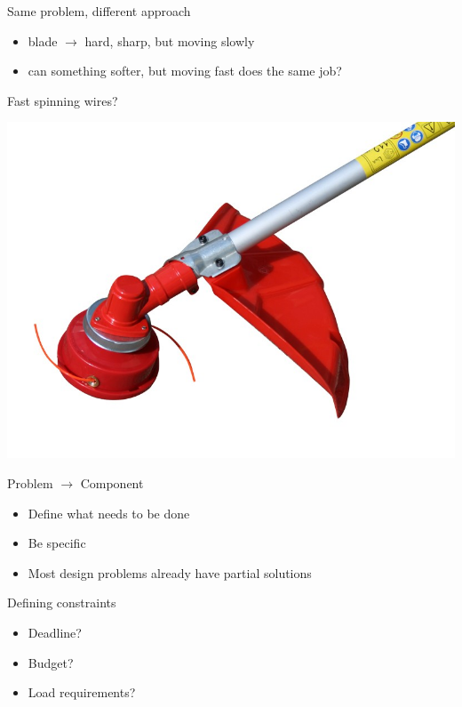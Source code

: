 \documentclass[10pt, svgnames]{beamer}
\begin{document}
\begin{frame}[label={sec:org883cc3a}]{Same problem, different approach}
\begin{itemize}
\item blade \(\rightarrow\) hard, sharp, but moving slowly
\item can something softer, but moving fast does the same job?
\end{itemize}
\end{frame}


\begin{frame}[label={sec:org0132e99}]{Fast spinning wires?}
\begin{center}
  \includegraphics[width=.8\linewidth]{./pictures/cutter-wire.jpg}
\end{center}
\end{frame}

\begin{frame}[label={sec:org2f8750e}]{Problem \(\rightarrow\) Component}
\begin{itemize}
\item Define what needs to be done
\item Be specific
\item Most design problems already have partial solutions
\end{itemize}
\end{frame}


\begin{frame}[label={sec:orgd744ef4}]{Defining constraints}
\begin{itemize}
\item Deadline?
\item Budget?
\item Load requirements?
\end{itemize}
\end{frame}
\end{document}
